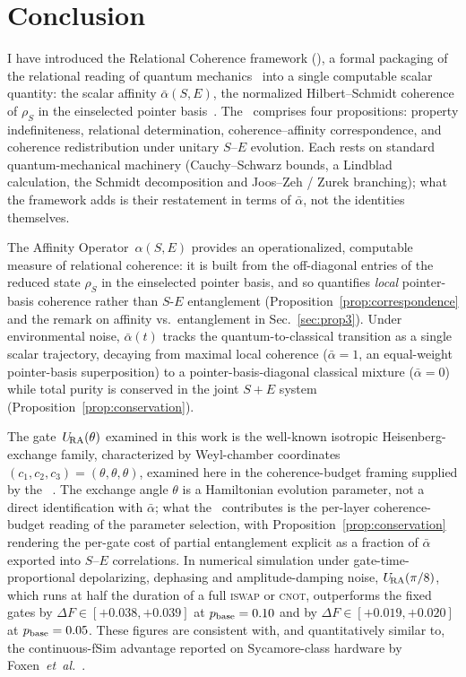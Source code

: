 
\section{Conclusion}
\label{sec:conc}

I have introduced the Relational Coherence framework (\RCF), a
formal packaging of the relational reading of quantum
mechanics~\cite{Bell1964,Rovelli1996,Rovelli2021} into a single
computable scalar quantity: the scalar affinity
$\bar\alpha(S,E)$, the normalized Hilbert--Schmidt coherence of
$\rho_S$ in the einselected pointer
basis~\cite{Zurek2003,Baumgratz2014,Streltsov2017Review}.
The \RCF~comprises four propositions: property indefiniteness, relational determination, coherence--affinity correspondence, and coherence redistribution under unitary $S$--$E$ evolution. Each rests on standard quantum-mechanical machinery (Cauchy--Schwarz bounds, a Lindblad calculation, the Schmidt decomposition and Joos--Zeh / Zurek branching); what the framework adds is their restatement in terms of $\bar\alpha$, not the identities themselves.

The Affinity Operator~$\alpha(S,E)$ provides an operationalized, computable
measure of relational coherence: it is built from the off-diagonal
entries of the reduced state $\rho_S$ in the einselected pointer basis,
and so quantifies \emph{local} pointer-basis coherence rather than $S$-$E$
entanglement (Proposition~\ref{prop:correspondence} and the remark on
affinity vs.\ entanglement in Sec.~\ref{sec:prop3}).
Under environmental noise, $\bar\alpha(t)$ tracks the quantum-to-classical
transition as a single scalar trajectory, decaying from maximal local
coherence ($\bar\alpha = 1$, an equal-weight pointer-basis superposition)
to a pointer-basis-diagonal classical mixture ($\bar\alpha = 0$) while
total purity is conserved in the joint $S{+}E$ system
(Proposition~\ref{prop:conservation}).

The gate~$U_{\!\mathrm{RA}}(\theta)$ examined in this work is the well-known
isotropic Heisenberg-exchange family, characterized by Weyl-chamber
coordinates $(c_1, c_2, c_3) = (\theta, \theta, \theta)$, examined here
in the coherence-budget framing supplied by the
\RCF~\cite{LossDiVincenzo1998,Zhang2003WeylChamber,Foxen2020,Abrams2020,Lacroix2020,Caldwell2018}.
The exchange angle $\theta$ is a Hamiltonian evolution parameter, not a
direct identification with $\bar\alpha$; what the \RCF~contributes is
the per-layer coherence-budget reading of the parameter selection, with
Proposition~\ref{prop:conservation} rendering the per-gate cost of
partial entanglement explicit as a fraction of $\bar\alpha$ exported
into $S$--$E$ correlations.
In numerical simulation under gate-time-proportional depolarizing, dephasing and amplitude-damping noise, $U_{\!\mathrm{RA}}(\pi/8)$, which runs at half the duration of a full \textsc{iswap} or \textsc{cnot}, outperforms the fixed gates by $\Delta F \in [+0.038, +0.039]$ at $p_{\rm base} = 0.10$ and by $\Delta F \in [+0.019, +0.020]$ at $p_{\rm base} = 0.05$. These figures are consistent with, and quantitatively similar to, the continuous-fSim advantage reported on Sycamore-class hardware by Foxen~\textit{et~al.}~\cite{Foxen2020}.

